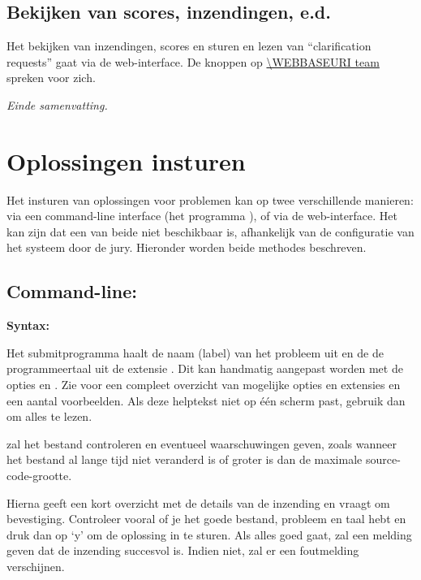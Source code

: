 \subsection*{Bekijken van scores, inzendingen, e.d.}

Het bekijken van inzendingen, scores en sturen en lezen van
``clarification requests'' gaat via de web-interface. De knoppen op
\url{\WEBBASEURI team} spreken voor zich.

\emph{Einde samenvatting.}

\newpage

\tableofcontents

\newpage
\section{Oplossingen insturen}\label{submit}

Het insturen van oplossingen voor problemen kan op twee verschillende
manieren: via een command-line interface (het programma ),
of via de web-interface. Het kan zijn dat een van beide niet beschikbaar
is, afhankelijk van de configuratie van het systeem door de jury.
Hieronder worden beide methodes beschreven.

\subsection{Command-line: }

\textbf{Syntax:} 

Het submitprogramma haalt de naam (label) van het probleem uit
 en de de programmeertaal uit de extensie
. Dit kan handmatig aangepast worden met de opties
 en . Zie
 voor een compleet overzicht van mogelijke
opties en extensies en een aantal voorbeelden. Als deze
helptekst niet op \'e\'en scherm past, gebruik dan
 om alles te lezen.

 zal het bestand controleren en eventueel
waarschuwingen geven, zoals wanneer het bestand al lange tijd niet
veranderd is of groter is dan de maximale source-code-grootte.

Hierna geeft  een kort overzicht met de details van de
inzending en vraagt om bevestiging. Controleer vooral of je het goede
bestand, probleem en taal hebt en druk dan op `y' om de oplossing in
te sturen. Als alles goed gaat, zal  een melding geven
dat de inzending succesvol is. Indien niet, zal er een foutmelding
verschijnen.

